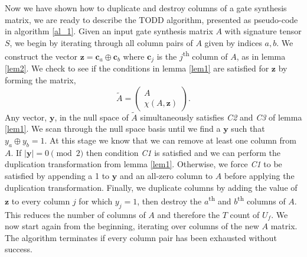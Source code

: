 \documentclass[notitlepage]{article}
\theoremstyle{definition}
\theoremstyle{problem}
\theoremstyle{lemma}
\begin{document}
		Now we have shown how to duplicate and destroy columns of a gate synthesis matrix, we are ready to describe the TODD algorithm, presented as pseudo-code in algorithm \ref{al_1}. Given an input gate synthesis matrix $A$ with signature tensor $S$, we begin by iterating through all column pairs of $A$ given by indices $a,b$. We construct the vector $\mathbf{z}=\mathbf{c}_a \oplus \mathbf{c}_b$ where $\mathbf{c}_j$ is the $j$\textsuperscript{th} column of $A$, as in lemma \ref{lem2}. We check to see if the conditions in lemma \ref{lem1} are satisfied for $\mathbf{z}$ by forming the matrix,
		\begin{equation}
		\tilde{A}=\begin{pmatrix}
		A \\ \chi(A,\mathbf{z})
		\end{pmatrix}.
		\end{equation}
		Any vector, $\mathbf{y}$, in the null space of $\tilde{A}$ simultaneously satisfies \emph{C2} and \emph{C3} of lemma \ref{lem1}. We scan through the null space basis until we find a $\mathbf{y}$ such that $y_a \oplus y_b = 1$. At this stage we know that we can remove at least one column from $A$. If $|\mathbf{y}|=0 \pmod{2}$ then condition \emph{C1} is satisfied and we can perform the duplication transformation from lemma \ref{lem1}. Otherwise, we force \emph{C1} to be satisfied by appending a 1 to $\mathbf{y}$ and an all-zero column to $A$ before applying the duplication transformation. Finally, we duplicate columns by adding the value of $\mathbf{z}$ to every column $j$ for which $y_j = 1$, then destroy the $a$\textsuperscript{th} and $b$\textsuperscript{th} columns of $A$. This reduces the number of columns of $A$ and therefore the $T$ count of $U_f$. We now start again from the beginning, iterating over columns of the new $A$ matrix. The algorithm terminates if every column pair has been exhausted without success.		

		

	
\end{document}
